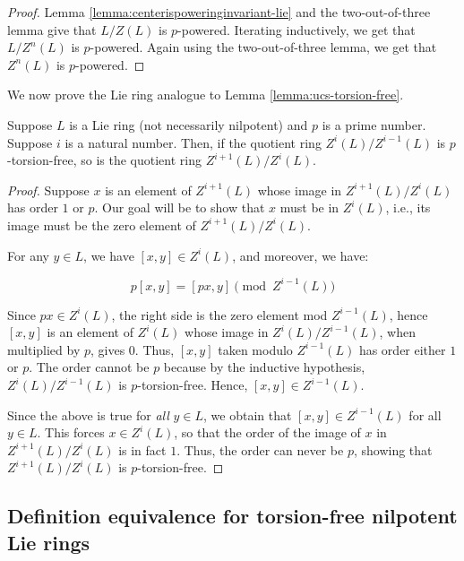 \begin{proof}
  Lemma \ref{lemma:centerispoweringinvariant-lie} and the two-out-of-three
  lemma give that $L/Z(L)$ is $p$-powered. Iterating inductively, we
  get that $L/Z^n(L)$ is $p$-powered. Again using the two-out-of-three
  lemma, we get that $Z^n(L)$ is $p$-powered.
\end{proof}

We now prove the Lie ring analogue to Lemma \ref{lemma:ucs-torsion-free}.

\begin{lemma}\label{lemma:ucs-torsion-free-lie}
  Suppose $L$ is a Lie ring (not necessarily nilpotent) and $p$ is a
  prime number. Suppose $i$ is a natural number. Then, if the quotient
  ring $Z^i(L)/Z^{i-1}(L)$ is $p$-torsion-free, so is the quotient
  ring $Z^{i+1}(L)/Z^i(L)$.
\end{lemma}

\begin{proof}
  Suppose $x$ is an element of $Z^{i+1}(L)$ whose image in
  $Z^{i+1}(L)/Z^i(L)$ has order $1$ or $p$. Our goal will be to show
  that $x$ must be in $Z^i(L)$, i.e., its image must be the zero
  element of $Z^{i+1}(L)/Z^i(L)$.

  For any $y \in L$, we have $[x,y] \in Z^i(L)$, and moreover, we
  have:

  $$p[x,y] = [px,y] \pmod{Z^{i-1}(L)}$$

  Since $px \in Z^i(L)$, the right side is the zero element mod
  $Z^{i-1}(L)$, hence $[x,y]$ is an element of $Z^i(L)$ whose image in
  $Z^i(L)/Z^{i-1}(L)$, when multiplied by $p$, gives $0$. Thus,
  $[x,y]$ taken modulo $Z^{i-1}(L)$ has order either $1$ or $p$. The
  order cannot be $p$ because by the inductive hypothesis,
  $Z^i(L)/Z^{i-1}(L)$ is $p$-torsion-free. Hence, $[x,y] \in
  Z^{i-1}(L)$.

  Since the above is true for {\em all} $y \in L$, we obtain that
  $[x,y] \in Z^{i-1}(L)$ for all $y \in L$. This forces $x \in
  Z^i(L)$, so that the order of the image of $x$ in
  $Z^{i+1}(L)/Z^i(L)$ is in fact $1$. Thus, the order can never be
  $p$, showing that $Z^{i+1}(L)/Z^i(L)$ is $p$-torsion-free.
\end{proof}

\subsection{Definition equivalence for torsion-free nilpotent Lie rings}

